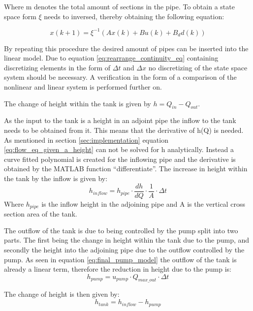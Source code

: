Where m denotes the total amount of sections in the pipe.  
To obtain a state space form $\xi$ needs to inversed, thereby obtaining the following equation:

\begin{equation}
	x(k+1) = \xi^{-1} (Ax(k)+Bu(k)+B_dd(k))
\end{equation}

By repeating this procedure the desired amount of pipes can be inserted into the linear model. Due to equation \ref{eq:rearrange_continuity_eq} containing discretizing elements in the form of $\Delta t$ and $\Delta x$ no discretizing of the state space system should be necessary. A verification in the form of a comparison of the nonlinear and linear system is performed further on. 

The change of height within the tank is given by $h = Q_{in}-Q_{out}$.

As the input to the tank is a height in an adjoint pipe the inflow to the tank needs to be obtained from it. This means that the derivative of h(Q) is needed. As mentioned in section \ref{sec:implementation} equation \ref{eq:flow_eq_given_a_height} can not be solved for h analytically. Instead a curve fitted polynomial is created for the inflowing pipe and the derivative is obtained by the MATLAB function ``differentiate''. The increase in height within the tank by the inflow is given by:
\begin{equation} \label{eq:heigh_in_flow_lin_tank}
	h_{inflow} = h_{pipe} \cdot \frac{dh}{dQ} \cdot \frac{1}{A} \cdot \Delta t 
\end{equation}
Where $h_{pipe}$ is the inflow height in the adjoining pipe and A is the vertical cross section area of the tank.

The outflow of the tank is due to being controlled by the pump split into two parts. The first being the change in height within the tank due to the pump, and secondly the height into the adjoining pipe due to the outflow controlled by the pump. 
As seen in equation \ref{eq:final_pump_model} the outflow of the tank is already a linear term, therefore the reduction in height due to the pump is:
\begin{equation}\label{eq:height_reduc_pump_lin_tank}
 	h_{pump} = u_{pump} \cdot Q_{max\_out} \cdot \Delta t
\end{equation} 

The change of height is then given by:
\begin{equation}
	h_{tank} = h_{inflow} - h_{pump}
\end{equation}

